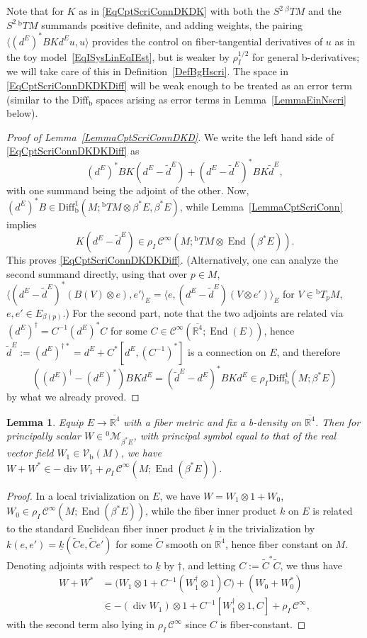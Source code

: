 \documentclass[reqno,11pt,letterpaper]{amsart}
\numberwithin{equation}{section}
\numberwithin{figure}{section}
\newtheorem{lemma}[thm]{Lemma}
\theoremstyle{definition}
\theoremstyle{remark}
\newcommand{\mc}{\mathcal}
\newcommand{\cC}{\mc C}
\newcommand{\cM}{\mc M}
\newcommand{\R}{\mathbb{R}}
\newcommand{\End}{\operatorname{End}}
\newcommand{\dv}{\operatorname{div}}
\newcommand{\la}{\langle}
\newcommand{\ol}{\overline}
\newcommand{\ra}{\rangle}
\newcommand{\ul}[1]{\underline{#1}{}}
\newcommand{\wt}{\widetilde}
\newcommand{\bop}{{\mathrm{b}}}
\newcommand{\Diff}{\mathrm{Diff}}
\newcommand{\Vf}{\mathcal V}
\newcommand{\Vb}{\Vf_\bop}
\newcommand{\Diffb}{\Diff_\bop}
\newcommand{\Tb}{{}^{\bop}T}
\newcommand{\Tbeta}{{}^{\beta}T}
\newcommand{\CI}{\cC^\infty}
\newcommand{\usref}[1]{{\upshape\ref{#1}}}
\begin{document}
Note that for $K$ as in \eqref{EqCptScriConnDKDK} with both the $S^2\,\Tbeta M$ and the $S^2\,\Tb M$ summands positive definite, and adding weights, the pairing $\la (d^E)^*B K d^E u,u\ra$ provides the control on fiber-tangential derivatives of $u$ as in the toy model~\eqref{EqISysLinEqIEst}, but is weaker by $\rho_I^{1/2}$ for general b-derivatives; we will take care of this in Definition~\ref{DefBgHscri}. The space in \eqref{EqCptScriConnDKDKDiff} will be weak enough to be treated as an error term (similar to the $\Diffb$ spaces arising as error terms in Lemma~\ref{LemmaEinNscri} below).

\begin{proof}[Proof of Lemma~\usref{LemmaCptScriConnDKD}]
  We write the left hand side of \eqref{EqCptScriConnDKDKDiff} as
  \[
    (d^E)^* B K (d^E-\tilde d^E) + (d^E-\tilde d^E)^* B K \tilde d^E,
  \]
  with one summand being the adjoint of the other. Now, $(d^E)^*B\in\Diffb^1(M;\Tb M\otimes\beta^*E,\allowbreak\beta^*E)$, while Lemma~\ref{LemmaCptScriConn} implies
  \[
    K(d^E-\tilde d^E) \in \rho_I\,\CI(M;\Tb M\otimes\End(\beta^*E)).
  \]
  This proves \eqref{EqCptScriConnDKDKDiff}. (Alternatively, one can analyze the second summand directly, using that over $p\in M$, $\la(d^E-\tilde d^E)^*(B(V)\otimes e),e'\ra_E = \la e, (d^E-\tilde d^E)(V\otimes e')\ra_E$ for $V\in\Tb_p M$, $e,e'\in E_{\beta(p)}$.) For the second part, note that the two adjoints are related via $(d^E)^\dag=C^{-1}(d^E)^*C$ for some $C\in\CI(\ol{\R^4};\End(E))$, hence $\tilde d^E:=(d^E)^{\dag *}=d^E+C^*[d^E,(C^{-1})^*]$ is a connection on $E$, and therefore
  \[
    ((d^E)^\dag-(d^E)^*)B K d^E=(\tilde d^E-d^E)^*B K d^E \in \rho_I\Diffb^1(M;\beta^*E)
  \]
  by what we already proved.
\end{proof}

\begin{lemma}
\label{LemmaCptScriWWstar}
  Equip $E\to\ol{\R^4}$ with a fiber metric and fix a b-density on $\ol{\R^4}$. Then for principally scalar $W\in{}^0\cM_{\beta^*E}$, with principal symbol equal to that of the real vector field $W_1\in\Vb(M)$, we have $W+W^*\in-\dv W_1+\rho_I\,\CI(M;\End(\beta^*E))$.
\end{lemma}
\begin{proof}
  In a local trivialization on $E$, we have $W=W_1\otimes 1+W_0$, $W_0\in\rho_I\,\CI(M;\End(\beta^*E))$, while the fiber inner product $k$ on $E$ is related to the standard Euclidean fiber inner product $\ul k$ in the trivialization by $k(e,e')=\ul k(\wt C e,\wt C e')$ for some $\wt C$ smooth on $\ol{\R^4}$, hence fiber constant on $M$. Denoting adjoints with respect to $\ul k$ by $\dag$, and letting $C:=\wt C^*\wt C$, we thus have
  \begin{align*}
    W+W^*&=\bigl(W_1\otimes 1+C^{-1}(W_1^\dag\otimes 1)C\bigr) + (W_0+W_0^*) \\
      &\in -(\dv W_1)\otimes 1 + C^{-1}[W_1^\dag\otimes 1,C] + \rho_I\,\CI,
  \end{align*}
  with the second term also lying in $\rho_I\,\CI$ since $C$ is fiber-constant.
\end{proof}
\end{document}
